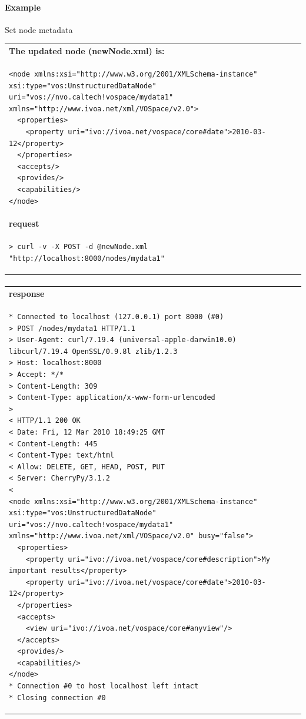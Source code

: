 \documentclass[11pt,a4paper]{ivoa}
\begin{document}
\paragraph{Example}
Set node metadata

\begin{tabular}{ p{10cm} }
\\
\textbf{The updated node (newNode.xml) is:} \\
\begin{lstlisting}
<node xmlns:xsi="http://www.w3.org/2001/XMLSchema-instance"
xsi:type="vos:UnstructuredDataNode"
uri="vos://nvo.caltech!vospace/mydata1"
xmlns="http://www.ivoa.net/xml/VOSpace/v2.0">
  <properties>
    <property uri="ivo://ivoa.net/vospace/core#date">2010-03-12</property>
  </properties>
  <accepts/>
  <provides/>
  <capabilities/>
</node>
\end{lstlisting} \\
\textbf{request} \\
\begin{lstlisting}
> curl -v -X POST -d @newNode.xml "http://localhost:8000/nodes/mydata1"
\end{lstlisting} \\
\end{tabular}
\paragraph{}
\begin{tabular}{ p{10cm} }
\textbf{response} \\
\begin{lstlisting}
* Connected to localhost (127.0.0.1) port 8000 (#0)
> POST /nodes/mydata1 HTTP/1.1
> User-Agent: curl/7.19.4 (universal-apple-darwin10.0) libcurl/7.19.4 OpenSSL/0.9.8l zlib/1.2.3
> Host: localhost:8000
> Accept: */*
> Content-Length: 309
> Content-Type: application/x-www-form-urlencoded
> 
< HTTP/1.1 200 OK
< Date: Fri, 12 Mar 2010 18:49:25 GMT
< Content-Length: 445
< Content-Type: text/html
< Allow: DELETE, GET, HEAD, POST, PUT
< Server: CherryPy/3.1.2
< 
<node xmlns:xsi="http://www.w3.org/2001/XMLSchema-instance"
xsi:type="vos:UnstructuredDataNode" uri="vos://nvo.caltech!vospace/mydata1"
xmlns="http://www.ivoa.net/xml/VOSpace/v2.0" busy="false">
  <properties>
    <property uri="ivo://ivoa.net/vospace/core#description">My important results</property>
    <property uri="ivo://ivoa.net/vospace/core#date">2010-03-12</property>
  </properties>
  <accepts>
    <view uri="ivo://ivoa.net/vospace/core#anyview"/>
  </accepts>
  <provides/>
  <capabilities/>
</node>
* Connection #0 to host localhost left intact
* Closing connection #0
\end{lstlisting}
\end{tabular}
\end{document}
